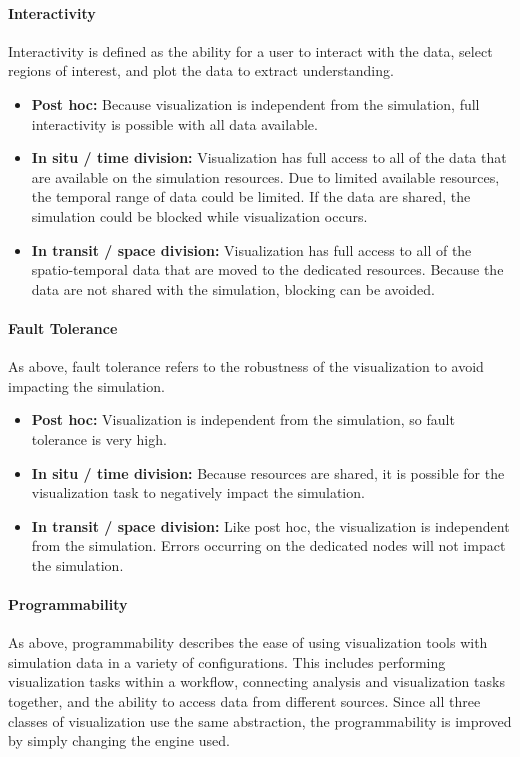 \paragraph{\textbf{Interactivity}}
Interactivity is defined as the ability for a user to interact with the data, select regions of interest, and plot the data to extract understanding.
\begin{itemize}
    \item \textbf{Post hoc:} Because visualization is independent from the simulation, full interactivity is possible with all data available.
    \item \textbf{In situ / time division:} Visualization has full access to all of the data that are available on the simulation resources. Due to limited available resources, the temporal range of data could be limited. If the data are shared, the simulation could be blocked while visualization occurs.
    \item \textbf{In transit / space division:} Visualization has full access to all of the spatio-temporal data that are moved to the dedicated resources. Because the data are not shared with the simulation, blocking can be avoided.
\end{itemize}


\paragraph{\textbf{Fault Tolerance}}
As above, fault tolerance refers to the robustness of the visualization to avoid impacting the simulation.
\begin{itemize}
    \item \textbf{Post hoc:} Visualization is independent from the simulation, so fault tolerance is very high.
    \item \textbf{In situ / time division:} Because resources are shared, it is possible for the visualization task to negatively impact the simulation.
    \item \textbf{In transit / space division:} Like post hoc, the visualization is independent from the simulation. Errors occurring on the dedicated nodes will not impact the simulation.
\end{itemize}

\paragraph{\textbf{Programmability}}
As above, programmability describes the ease of using visualization tools with simulation data in a variety of configurations. This includes performing visualization tasks within a workflow, connecting analysis and visualization tasks together, and the ability to access data from different sources.
 Since all three classes of visualization use the same abstraction, the programmability is improved by simply  changing the engine used.

